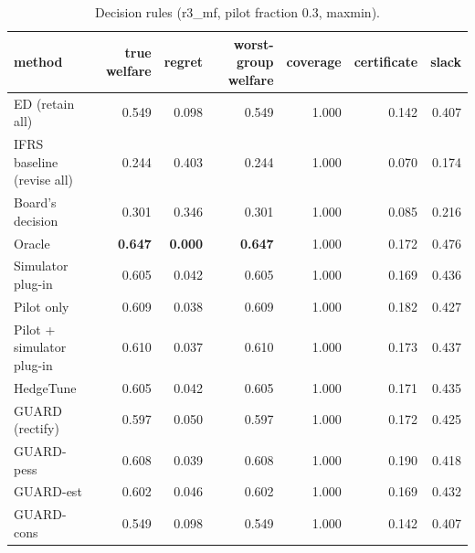 \begin{table}[t]
\centering
\small
\begin{tabular}{lrrrrrr}
\toprule
method & true welfare & regret & worst-group welfare & coverage & certificate & slack \\
\midrule
ED (retain all) & 0.549 & 0.098 & 0.549 & 1.000 & 0.142 & 0.407 \\
IFRS baseline (revise all) & 0.244 & 0.403 & 0.244 & 1.000 & 0.070 & 0.174 \\
Board's decision & 0.301 & 0.346 & 0.301 & 1.000 & 0.085 & 0.216 \\
Oracle & \textbf{0.647} & \textbf{0.000} & \textbf{0.647} & 1.000 & 0.172 & 0.476 \\
Simulator plug-in & 0.605 & 0.042 & 0.605 & 1.000 & 0.169 & 0.436 \\
Pilot only & 0.609 & 0.038 & 0.609 & 1.000 & 0.182 & 0.427 \\
Pilot + simulator plug-in & 0.610 & 0.037 & 0.610 & 1.000 & 0.173 & 0.437 \\
HedgeTune & 0.605 & 0.042 & 0.605 & 1.000 & 0.171 & 0.435 \\
GUARD (rectify) & 0.597 & 0.050 & 0.597 & 1.000 & 0.172 & 0.425 \\
GUARD-pess & 0.608 & 0.039 & 0.608 & 1.000 & 0.190 & 0.418 \\
GUARD-est & 0.602 & 0.046 & 0.602 & 1.000 & 0.169 & 0.432 \\
GUARD-cons & 0.549 & 0.098 & 0.549 & 1.000 & 0.142 & 0.407 \\
\bottomrule
\end{tabular}
\caption{Decision rules (r3\_mf, pilot fraction 0.3, maxmin).}
\label{tab:methods-maxmin}
\end{table}
